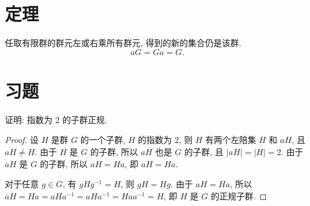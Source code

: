 
    \section{定理}
        \begin{theorem}
            任取有限群的群元左或右乘所有群元, 得到的新的集合仍是该群.
            $$
            aG = Ga = G.
            $$
        \end{theorem}

    \section{习题}  

        \begin{example}
            证明: 指数为 2 的子群正规.
        \end{example}

        \begin{proof}
            设 $H$ 是群 $G$ 的一个子群, $H$ 的指数为 2, 则 $H$ 有两个左陪集 $H$ 和 $aH$, 且 $aH \neq H$. 由于 $H$ 是 $G$ 的子群, 所以 $aH$ 也是 $G$ 的子群, 且 $|aH| = |H| = 2$. 由于 $aH$ 是 $G$ 的子群, 所以 $aH = Ha$, 即 $aH = Ha$.

            对于任意 $g \in G$, 有 $gHg^{-1} = H$, 则 $gH = Hg$. 由于 $aH = Ha$, 所以 $aH = Ha = aHa^{-1} = aHa^{-1} = Haa^{-1} = H$, 即 $H$ 是 $G$ 的正规子群.
        \end{proof}